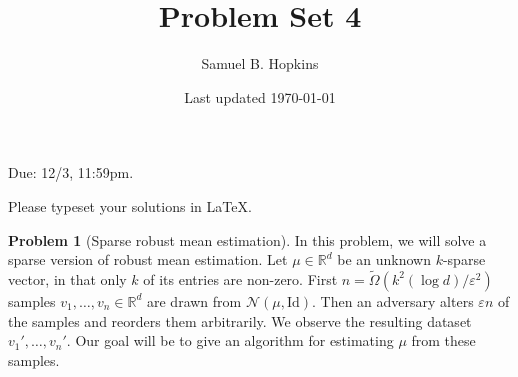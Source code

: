 \documentclass[11pt]{article}
\title{Problem Set 4}
\author{Samuel B. Hopkins}
\date{Last updated \today}
\theoremstyle{definition}
\newtheorem{problem}[theorem]{Problem}
\newcommand{\R}{\mathbb{R}} %
\renewcommand{\epsilon}{\varepsilon}
\newcommand{\Id}{\mathrm{Id}}
\begin{document}
\maketitle

Due: 12/3, 11:59pm.

Please typeset your solutions in LaTeX.

\begin{problem}[Sparse robust mean estimation]

  In this problem, we will solve a sparse version of robust mean estimation.  Let $\mu \in \R^d$ be an unknown $k$-sparse vector, in that only $k$ of its entries are non-zero.  First $n = \widetilde{\Omega}(k^2 (\log d)/\epsilon^2)$ samples $v_1, \dots, v_n \in \R^d$ are drawn from $\mathcal{N}(\mu, \Id)$. Then an adversary alters $\epsilon n$ of the samples and reorders them arbitrarily.  We observe the resulting dataset $v_1', \dots , v_n'$.   Our goal will be to give an algorithm for estimating $\mu$ from these samples.


\end{problem}
\end{document}
